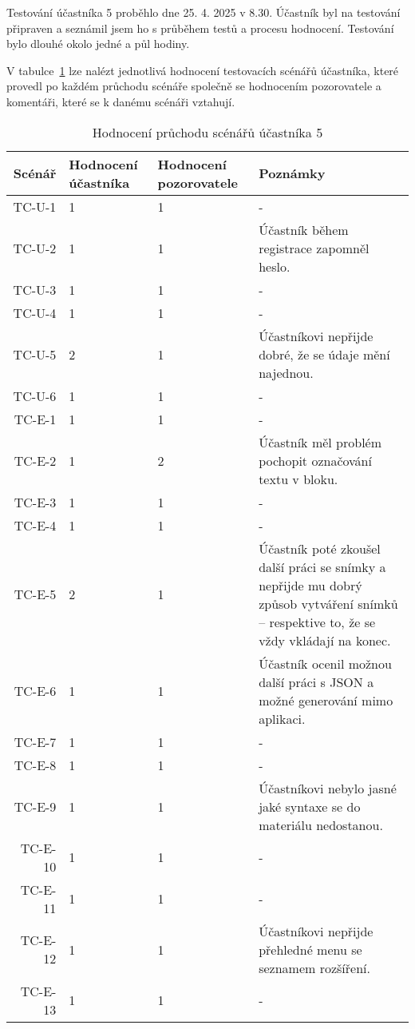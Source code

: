 Testování účastníka 5 proběhlo dne 25. 4. 2025 v 8.30. 
Účastník byl na testování připraven a seznámil jsem ho s průběhem testů a procesu hodnocení. 
Testování bylo dlouhé okolo jedné a půl hodiny.

V tabulce~\ref{tab:hodnoceniPruchoduUcastnika5} lze nalézt jednotlivá hodnocení testovacích scénářů účastníka, které provedl po každém průchodu scénáře společně se hodnocením pozorovatele a komentáři, které se k danému scénáři vztahují.

\begin{longtable}{r|p{2cm}|p{2cm}|p{6cm}}
    \caption{Hodnocení průchodu scénářů účastníka 5}\label{tab:hodnoceniPruchoduUcastnika5}\\
Scénář & Hodnocení účastníka & Hodnocení pozorovatele & Poznámky\\\hline\hline
TC-U-1   & 1 & 1 & - \\\hline
TC-U-2   & 1 & 1 & Účastník během registrace zapomněl heslo. \\\hline
TC-U-3   & 1 & 1 & - \\\hline
TC-U-4   & 1 & 1 & - \\\hline
TC-U-5   & 2 & 1 & Účastníkovi nepřijde dobré, že se údaje mění najednou. \\\hline
TC-U-6   & 1 & 1 & - \\\hline
TC-E-1   & 1 & 1 & - \\\hline
TC-E-2   & 1 & 2 & Účastník měl problém pochopit označování textu v bloku. \\\hline
TC-E-3   & 1 & 1 & - \\\hline
TC-E-4   & 1 & 1 & - \\\hline
TC-E-5   & 2 & 1 & Účastník poté zkoušel další práci se snímky a nepřijde mu dobrý způsob vytváření snímků -- respektive to, že se vždy vkládají na konec. \\\hline
TC-E-6   & 1 & 1 & Účastník ocenil možnou další práci s JSON a možné generování mimo aplikaci. \\\hline
TC-E-7   & 1 & 1 & - \\\hline
TC-E-8   & 1 & 1 & - \\\hline
TC-E-9   & 1 & 1 & Účastníkovi nebylo jasné jaké syntaxe se do materiálu nedostanou. \\\hline
TC-E-10  & 1 & 1 & - \\\hline
TC-E-11  & 1 & 1 & - \\\hline
TC-E-12  & 1 & 1 & Účastníkovi nepřijde přehledné menu se seznamem rozšíření. \\\hline
TC-E-13  & 1 & 1 & - \\\hline

\end{longtable}
